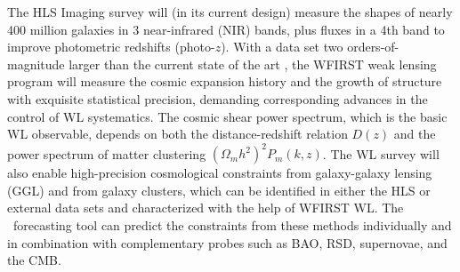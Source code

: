 %
%

The HLS Imaging survey will (in its current design) measure the shapes of
nearly 400 million galaxies in 3 near-infrared (NIR) bands, plus fluxes in a 4th band
to improve photometric redshifts (photo-$z$).  With a data set two orders-of-magnitude
larger than the current state of the art \cite{Heymans2012,Becker2015},
the WFIRST weak lensing program will
measure the cosmic expansion history and the growth of structure with
exquisite statistical precision, demanding corresponding advances in the
control of WL systematics.  The cosmic shear power spectrum, which is the
basic WL observable, depends on both the distance-redshift relation $D(z)$
and the power spectrum of matter clustering $(\Omega_m h^2)^2 P_m(k,z)$.
The WL survey will also enable high-precision cosmological constraints
from galaxy-galaxy lensing (GGL) and from galaxy clusters, which can be
identified in either the HLS or external data sets and characterized with
the help of WFIRST WL.  The \CoLi\ forecasting tool can predict the constraints
from these methods individually and in combination with complementary
probes such as BAO, RSD, supernovae, and the CMB.




